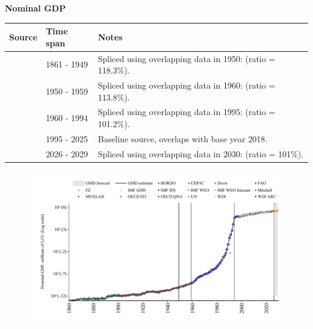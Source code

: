 \documentclass[12pt,a4paper,landscape]{article}
\begin{document}
\begin{adjustbox}{max totalsize={\paperwidth}{\paperheight},center}
\begin{minipage}[t][\textheight][t]{\textwidth}
\vspace*{0.5cm}
{}
\begin{center}
{\Large\bfseries Nominal GDP}
\end{center}
\vspace{0.5cm}
\begin{table}[H]
\centering
\small
\begin{tabular}{|l|l|l|}
\hline
\textbf{Source} & \textbf{Time span} & \textbf{Notes} \\
\hline
\rowcolor{white}\cite{Mitchell}& 1861 - 1949 &Spliced using overlapping data in 1950: (ratio = 118.3\%). \\
\rowcolor{lightgray}\cite{IMF_GDD}& 1950 - 1959 &Spliced using overlapping data in 1960: (ratio = 113.8\%). \\
\rowcolor{white}\cite{WDI}& 1960 - 1994 &Spliced using overlapping data in 1995: (ratio = 101.2\%). \\
\rowcolor{lightgray}\cite{OECD_EO}& 1995 - 2025 &Baseline source, overlaps with base year 2018. \\
\rowcolor{white}\cite{IMF_WEO_forecast}& 2026 - 2029 &Spliced using overlapping data in 2030: (ratio = 101\%). \\
\hline
\end{tabular}
\end{table}
\begin{figure}[H]
\centering
\includegraphics[width=\textwidth,height=0.6\textheight,keepaspectratio]{graphs/BRA_nGDP.pdf}
\end{figure}
\end{minipage}
\end{adjustbox}
\end{document}
